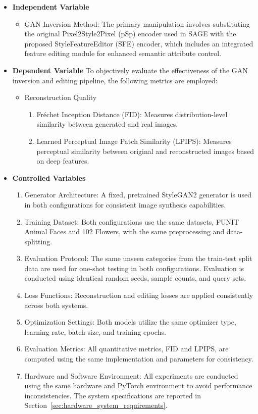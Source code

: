 \begin{itemize}
    \item \textbf{Independent Variable}
    \begin{itemize}
        \item GAN Inversion Method: The primary manipulation involves substituting the original Pixel2Style2Pixel (pSp) encoder used in SAGE with the proposed StyleFeatureEditor (SFE) encoder, which includes an integrated feature editing module for enhanced semantic attribute control.
    \end{itemize}

    \item \textbf{Dependent Variable}
    To objectively evaluate the effectiveness of the GAN inversion and editing pipeline, the following metrics are employed:
    \begin{itemize}
        \item Reconstruction Quality
        \begin{enumerate}
            \item Fr\'echet Inception Distance (FID): Measures distribution-level similarity between generated and real images.
            \item Learned Perceptual Image Patch Similarity (LPIPS): Measures perceptual similarity between original and reconstructed images based on deep features.
        \end{enumerate}
    \end{itemize}

    \item \textbf{Controlled Variables}
    \begin{enumerate}
        \item Generator Architecture: A fixed, pretrained StyleGAN2 generator is used in both configurations for consistent image synthesis capabilities.
        \item Training Dataset: Both configurations use the same datasets, FUNIT Animal Faces and 102 Flowers, with the same preprocessing and data-splitting.
        \item Evaluation Protocol: The same unseen categories from the train-test split data are used for one-shot testing in both configurations. Evaluation is conducted using identical random seeds, sample counts, and query sets.
        \item Loss Functions: Reconstruction and editing losses are applied consistently across both systems.
        \item Optimization Settings: Both models utilize the same optimizer type, learning rate, batch size, and training epochs.
        \item Evaluation Metrics: All quantitative metrics, FID and LPIPS, are computed using the same implementation and parameters for consistency.
        \item Hardware and Software Environment: All experiments are conducted using the same hardware and PyTorch environment to avoid performance inconsistencies. The system specifications are reported in Section~\ref{sec:hardware_system_requirements}.
    \end{enumerate}


\end{itemize}
